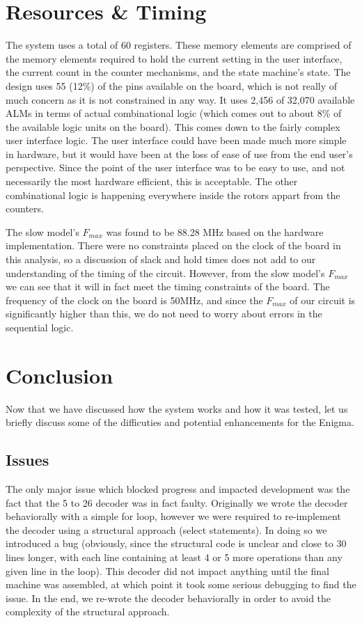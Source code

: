 \documentclass{article}
\begin{document}
\section{Resources \& Timing}
The system uses a total of 60 registers. These memory elements are comprised of the memory elements required to hold the current setting in the user interface, the current count in the counter mechanisms, and the state machine's state. The design uses 55 (12\%) of the pins available on the board, which is not really of much concern as it is not constrained in any way. It uses 2,456 of 32,070 available ALMs in terms of actual combinational logic (which comes out to about 8\% of the available logic units on the board). This comes down to the fairly complex user interface logic. The user interface could have been made much more simple in hardware, but it would have been at the loss of ease of use from the end user's perspective. Since the point of the user interface was to be easy to use, and not necessarily the most hardware efficient, this is acceptable. The other combinational logic is happening everywhere inside the rotors appart from the counters. 

The slow model's $F_{max}$ was found to be 88.28 MHz based on the hardware implementation. There were no constraints placed on the clock of the board in this analysis, so a discussion of slack and hold times does not add to our understanding of the timing of the circuit. However, from the slow model's $F_{max}$ we can see that it will in fact meet the timing constraints of the board. The frequency of the clock on the board is 50MHz, and since the $F_{max}$ of our circuit is significantly higher than this, we do not need to worry about errors in the sequential logic.

\section{Conclusion}
Now that we have discussed how the system works and how it was tested, let us briefly discuss some of the difficuties and potential enhancements for the Enigma. 

\subsection{Issues}
The only major issue which blocked progress and impacted development was the fact that the 5 to 26 decoder was in fact faulty. Originally we wrote the decoder behaviorally with a simple for loop, however we were required to re-implement the decoder using a structural approach (select statements). In doing so we introduced a bug (obviously, since the structural code is unclear and close to 30 lines longer, with each line containing at least 4 or 5 more operations than any given line in the loop). This decoder did not impact anything until the final machine was assembled, at which point it took some serious debugging to find the issue. In the end, we re-wrote the decoder behaviorally in order to avoid the complexity of the structural approach. 
\end{document}

